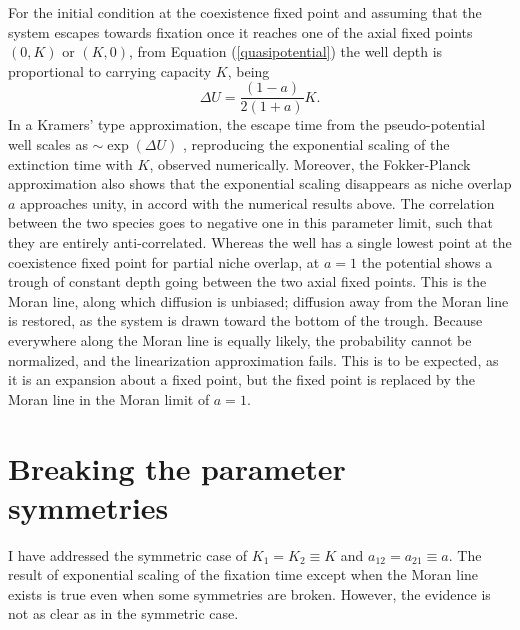 For the initial condition at the coexistence fixed point and assuming that the system escapes towards fixation once it reaches one of the axial fixed points $(0,K)$ or $(K,0)$, from Equation (\ref{quasipotential}) the well depth is proportional to carrying capacity $K$, being
\begin{equation}
\Delta U = \frac{(1-a)}{2(1+a)}K.
\end{equation}
In a Kramers' type approximation, the escape time from the pseudo-potential well scales as $\sim \exp(\Delta U)$ \cite{Hanggi1990}, reproducing the exponential scaling of the extinction time with $K$, observed numerically.  Moreover, the Fokker-Planck approximation also shows that the exponential scaling disappears as niche overlap $a$ approaches unity, in accord with the numerical results above. 
The correlation between the two species goes to negative one in this parameter limit, such that they are entirely anti-correlated. 
Whereas the well has a single lowest point at the coexistence fixed point for partial niche overlap, at $a=1$ the potential shows a trough of constant depth going between the two axial fixed points. 
This is the Moran line, along which diffusion is unbiased; diffusion away from the Moran line is restored, as the system is drawn toward the bottom of the trough. 
Because everywhere along the Moran line is equally likely, the probability cannot be normalized, and the linearization approximation fails. This is to be expected, as it is an expansion about a fixed point, but the fixed point is replaced by the Moran line in the Moran limit of $a=1$. 


\section{Breaking the parameter symmetries}
I have addressed the symmetric case of $K_1 = K_2 \equiv K$ and $a_{12} = a_{21} \equiv a$. 
The result of exponential scaling of the fixation time except when the Moran line exists is true even when some symmetries are broken. 
However, the evidence is not as clear as in the symmetric case. 

